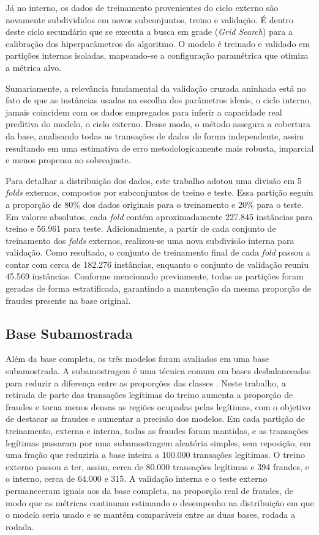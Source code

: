 \documentclass{uflamon}          %
\begin{document}
Já no interno, os dados de treinamento provenientes do ciclo externo são novamente subdivididos em novos subconjuntos, treino e validação. É dentro deste ciclo secundário que se executa a busca em grade (\textit{Grid Search}) para a calibração dos hiperparâmetros do algoritmo. O modelo é treinado e validado em partições internas isoladas, mapeando-se a configuração paramétrica que otimiza a métrica alvo.

Sumariamente, a relevância fundamental da validação cruzada aninhada está no fato de que as instâncias usadas na escolha dos parâmetros ideais, o ciclo interno, jamais coincidem com os dados empregados para inferir a capacidade real preditiva do modelo, o ciclo externo. Desse modo, o método assegura a cobertura da base, analisando todas as transações de dados de forma independente, assim resultando em uma estimativa de erro metodologicamente mais robusta, imparcial e menos propensa ao sobreajuste.

Para detalhar a distribuição dos dados, este trabalho adotou uma divisão em 5 \textit{folds} externos, compostos por subconjuntos de treino e teste. Essa partição seguiu a proporção de 80\% dos dados originais para o treinamento e 20\% para o teste. Em valores absolutos, cada \textit{fold} contém aproximadamente 227.845 instâncias para treino e 56.961 para teste. Adicionalmente, a partir de cada conjunto de treinamento dos \textit{folds} externos, realizou-se uma nova subdivisão interna para validação. Como resultado, o conjunto de treinamento final de cada \textit{fold} passou a contar com cerca de 182.276 instâncias, enquanto o conjunto de validação reuniu 45.569 instâncias. Conforme mencionado previamente, todas as partições foram geradas de forma estratificada, garantindo a manutenção da mesma proporção de fraudes presente na base original.

\subsection{Base Subamostrada}
\label{sec:subamostragem}

Além da base completa, os três modelos foram avaliados em uma base subamostrada. A subamostragem é uma técnica comum em bases desbalanceadas para reduzir a diferença entre as proporções das classes \cite{dalpozzolo2015}. Neste trabalho, a retirada de parte das transações legítimas do treino aumenta a proporção de fraudes e torna menos densas as regiões ocupadas pelas legítimas, com o objetivo de destacar as fraudes e aumentar a precisão dos modelos. Em cada partição de treinamento, externa e interna, todas as fraudes foram mantidas, e as transações legítimas passaram por uma subamostragem aleatória simples, sem reposição, em uma fração que reduziria a base inteira a 100.000 transações legítimas. O treino externo passou a ter, assim, cerca de 80.000 transações legítimas e 394 fraudes, e o interno, cerca de 64.000 e 315. A validação interna e o teste externo permaneceram iguais aos da base completa, na proporção real de fraudes, de modo que as métricas continuam estimando o desempenho na distribuição em que o modelo seria usado e se mantêm comparáveis entre as duas bases, rodada a rodada.
\end{document}
